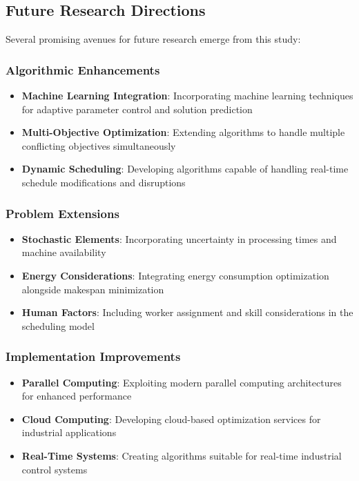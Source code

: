 \documentclass[11pt,a4paper]{article}
\begin{document}
\subsection{Future Research Directions}

Several promising avenues for future research emerge from this study:

\subsubsection{Algorithmic Enhancements}

\begin{itemize}
    \item \textbf{Machine Learning Integration}: Incorporating machine learning techniques for adaptive parameter control and solution prediction
    \item \textbf{Multi-Objective Optimization}: Extending algorithms to handle multiple conflicting objectives simultaneously
    \item \textbf{Dynamic Scheduling}: Developing algorithms capable of handling real-time schedule modifications and disruptions
\end{itemize}

\subsubsection{Problem Extensions}

\begin{itemize}
    \item \textbf{Stochastic Elements}: Incorporating uncertainty in processing times and machine availability
    \item \textbf{Energy Considerations}: Integrating energy consumption optimization alongside makespan minimization
    \item \textbf{Human Factors}: Including worker assignment and skill considerations in the scheduling model
\end{itemize}

\subsubsection{Implementation Improvements}

\begin{itemize}
    \item \textbf{Parallel Computing}: Exploiting modern parallel computing architectures for enhanced performance
    \item \textbf{Cloud Computing}: Developing cloud-based optimization services for industrial applications
    \item \textbf{Real-Time Systems}: Creating algorithms suitable for real-time industrial control systems
\end{itemize}
\end{document}
